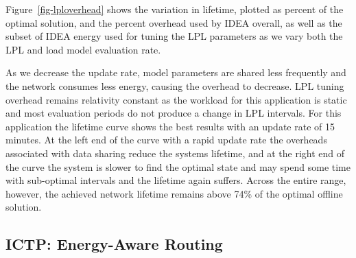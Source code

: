 \documentclass{sig-alternate}
\begin{document}
Figure~\ref{fig-lploverhead} shows the variation in lifetime, plotted as
percent of the optimal solution, and the percent overhead used by IDEA
overall, as well as the subset of IDEA energy used for tuning the LPL
parameters as we vary both the LPL and load model evaluation rate. 

As we decrease the update rate, model parameters are shared less frequently
and the network consumes less energy, causing the overhead to decrease. LPL
tuning overhead remains relativity constant as the workload for this
application is static and most evaluation periods do not produce a change in
LPL intervals. For this application the lifetime curve shows the best results
with an update rate of 15 minutes. At the left end of the curve with a rapid
update rate the overheads associated with data sharing reduce the systems
lifetime, and at the right end of the curve the system is slower to find the
optimal state and may spend some time with sub-optimal intervals and the
lifetime again suffers. Across the entire range, however, the achieved
network lifetime remains above 74\% of the optimal offline solution.

\vfill\eject

\subsection{ICTP: Energy-Aware Routing}
\end{document}
